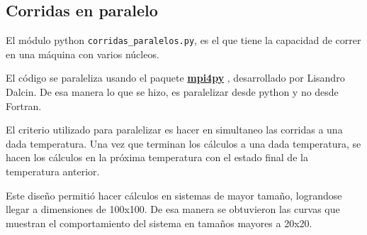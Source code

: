 \subsection{Corridas en paralelo}\label{paralelo}

El módulo python \texttt{corridas\_paralelos.py}, es el que tiene la capacidad 
de correr en una máquina con varios núcleos.

El código se paraleliza usando el paquete \href{http://mpi4py.scipy.org/} {\textbf{mpi4py}} ,  desarrollado por Lisandro Dalcin.
De esa manera lo que se hizo, es paralelizar desde python y no desde Fortran.

El criterio utilizado para paralelizar es hacer en simultaneo  las corridas a 
una dada temperatura. 
Una vez que terminan los cálculos a una dada temperatura, se hacen los cálculos 
en la próxima temperatura con el estado final de la temperatura anterior.

Este diseño permitió hacer cálculos en sistemas de mayor tamaño, lograndose llegar a dimensiones
de 100x100. De esa manera se obtuvieron las curvas que muestran el comportamiento del sistema en
tamaños mayores a 20x20.
